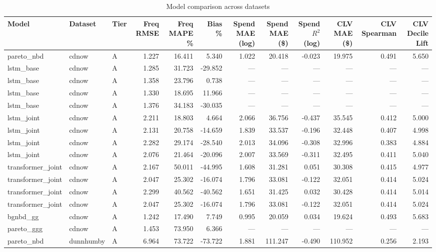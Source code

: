 \begin{table}
\caption{Model comparison across datasets}
\label{tab:model_comparison}
\begin{tabular}{lllrrrrrrrrr}
\toprule
Model & Dataset & Tier & Freq RMSE & Freq MAPE \% & Bias \% & Spend MAE (log) & Spend MAE (\$) & Spend $R^2$ (log) & CLV MAE (\$) & CLV Spearman & CLV Decile Lift \\
\midrule
pareto_nbd & cdnow & A & 1.227 & 16.411 & 5.340 & 1.022 & 20.418 & -0.023 & 19.975 & 0.491 & 5.650 \\
lstm_base & cdnow & A & 1.285 & 31.723 & -29.852 & — & — & — & — & — & — \\
lstm_base & cdnow & A & 1.358 & 23.796 & 0.738 & — & — & — & — & — & — \\
lstm_base & cdnow & A & 1.330 & 18.695 & 11.966 & — & — & — & — & — & — \\
lstm_base & cdnow & A & 1.376 & 34.183 & -30.035 & — & — & — & — & — & — \\
lstm_joint & cdnow & A & 2.211 & 18.803 & 4.664 & 2.066 & 36.756 & -0.437 & 35.545 & 0.412 & 5.000 \\
lstm_joint & cdnow & A & 2.131 & 20.758 & -14.659 & 1.839 & 33.537 & -0.196 & 32.448 & 0.407 & 4.998 \\
lstm_joint & cdnow & A & 2.282 & 29.174 & -28.540 & 2.013 & 34.096 & -0.308 & 32.996 & 0.383 & 4.884 \\
lstm_joint & cdnow & A & 2.076 & 21.464 & -20.096 & 2.007 & 33.569 & -0.311 & 32.495 & 0.411 & 5.040 \\
transformer_joint & cdnow & A & 2.167 & 50.011 & -44.995 & 1.608 & 31.281 & 0.051 & 30.308 & 0.415 & 4.977 \\
transformer_joint & cdnow & A & 2.047 & 25.302 & -16.074 & 1.796 & 33.081 & -0.122 & 32.051 & 0.414 & 5.024 \\
transformer_joint & cdnow & A & 2.299 & 40.562 & -40.562 & 1.651 & 31.425 & 0.032 & 30.428 & 0.414 & 5.014 \\
transformer_joint & cdnow & A & 2.047 & 25.302 & -16.074 & 1.796 & 33.081 & -0.122 & 32.051 & 0.414 & 5.024 \\
bgnbd_gg & cdnow & A & 1.242 & 17.490 & 7.749 & 0.995 & 20.059 & 0.034 & 19.624 & 0.493 & 5.683 \\
pareto_ggg & cdnow & A & 1.453 & 73.950 & 6.366 & — & — & — & — & — & — \\
pareto_nbd & dunnhumby & A & 6.964 & 73.722 & -73.722 & 1.881 & 111.247 & -0.490 & 110.952 & 0.256 & 2.193 \\

\end{tabular}
\end{table}
